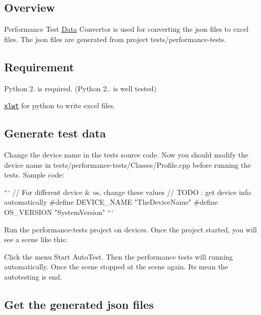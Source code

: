 \subsection*{Overview}

Performance Test \hyperlink{classData}{Data} Convertor is used for converting the json files to excel files. The json files are generated from project {\ttfamily tests/performance-\/tests}.

\subsection*{Requirement}


\begin{DoxyItemize}
\item Python 2. is required. (Python 2.. is well tested)
\item \href{https://pypi.python.org/pypi/xlwt/}{\tt xlwt} for python to write excel files.
\end{DoxyItemize}

\subsection*{Generate test data}


\begin{DoxyEnumerate}
\item Change the device name in the tests source code. Now you should modify the device name in {\ttfamily tests/performance-\/tests/\+Classes/\+Profile.\+cpp} before running the tests. Sample code\+: \begin{DoxyVerb}```
// For different device & os, change these values
// TODO : get device info automatically
#define DEVICE_NAME         "TheDeviceName"
#define OS_VERSION          "SystemVersion"
```
\end{DoxyVerb}

\item Run the performance-\/tests project on devices. Once the project started, you will see a scene like this\+: 
\item Click the menu {\ttfamily Start Auto\+Test}. Then the performance tests will running automatically. Once the scene stopped at the scene again. It\textquotesingle{}s mean the autotesting is end.
\end{DoxyEnumerate}

\subsection*{Get the generated json files}

